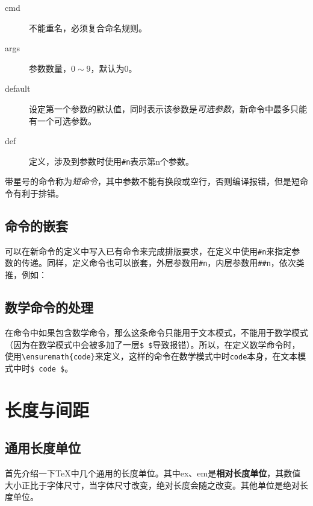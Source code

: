 \begin{description}
    \item[cmd] 不能重名，必须复合命名规则。
    \item[args] 参数数量，$ 0\sim9 $，默认为$ 0 $。
    \item[default] 设定第一个参数的默认值，同时表示该参数是\textit{可选参数}，新命令中最多只能有一个可选参数。
    \item[def] 定义，涉及到参数时使用\lstinline|#n|表示第n个参数。
\end{description}

带星号的命令称为\textit{短命令}，其中参数不能有换段或空行，否则编译报错，但是短命令有利于排错。

\begin{latex}
\newcommand{cmd}[args][default]{def}
\newcommand*{cmd}[args][default]{def}
\renewcommand{cmd}[args][default]{def}
\renewcommand*{cmd}[args][default]{def}
\end{latex}

\subsection{命令的嵌套}
可以在新命令的定义中写入已有命令来完成排版要求，在定义中使用\lstinline|#n|来指定参数的传递。同样，定义命令也可以嵌套，外层参数用\lstinline|#n|，内层参数用\lstinline|##n|，依次类推，例如：

\begin{latex}
\newcommand{\A}{\renewcommand{\B}{def}}
\end{latex}

\subsection{数学命令的处理}
在命令中如果包含数学命令，那么这条命令只能用于文本模式，不能用于数学模式（因为在数学模式中会被多加了一层\lstinline|$ $|导致报错）。所以，在定义数学命令时，使用\lstinline|\ensuremath{code}|来定义，这样的命令在数学模式中时\lstinline|code|本身，在文本模式中时\lstinline|$ code $|。


\section{长度与间距}
\subsection*{通用长度单位}
首先介绍一下\TeX 中几个通用的长度单位。其中ex、em是\textbf{相对长度单位}，其数值大小正比于字体尺寸，当字体尺寸改变，绝对长度会随之改变。其他单位是绝对长度单位。

